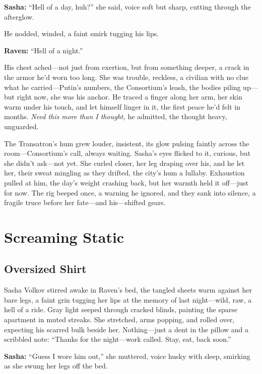 \documentclass[12pt]{book}
\begin{document}
\vspace{0.5em}
\textbf{Sasha:} “Hell of a day, huh?” she said, voice soft but sharp, cutting through the afterglow.

He nodded, winded, a faint smirk tugging his lips.

\vspace{0.5em}
\textbf{Raven:} “Hell of a night.”

His chest ached—not just from exertion, but from something deeper, a crack in the armor he’d worn too long. She was trouble, reckless, a civilian with no clue what he carried—Putin’s numbers, the Consortium’s leash, the bodies piling up—but right now, she was his anchor. He traced a finger along her arm, her skin warm under his touch, and let himself linger in it, the first peace he’d felt in months. \textit{Need this more than I thought,} he admitted, the thought heavy, unguarded.

The Transatron’s hum grew louder, insistent, its glow pulsing faintly across the room—Consortium’s call, always waiting. Sasha’s eyes flicked to it, curious, but she didn’t ask—not yet. She curled closer, her leg draping over his, and he let her, their sweat mingling as they drifted, the city’s hum a lullaby. Exhaustion pulled at him, the day’s weight crashing back, but her warmth held it off—just for now. The rig beeped once, a warning he ignored, and they sank into silence, a fragile truce before her fate—and his—shifted gears.

\chapter{Screaming Static}

\section{Oversized Shirt}

Sasha Volkov stirred awake in Raven’s bed, the tangled sheets warm against her bare legs, a faint grin tugging her lips at the memory of last night—wild, raw, a hell of a ride. Gray light seeped through cracked blinds, painting the sparse apartment in muted streaks. She stretched, arms popping, and rolled over, expecting his scarred bulk beside her. Nothing—just a dent in the pillow and a scribbled note: \enquote{Thanks for the night—work called. Stay, eat, back soon.} 

\vspace{0.5em}
\textbf{Sasha:} “Guess I wore him out,” she muttered, voice husky with sleep, smirking as she swung her legs off the bed.
\end{document}
